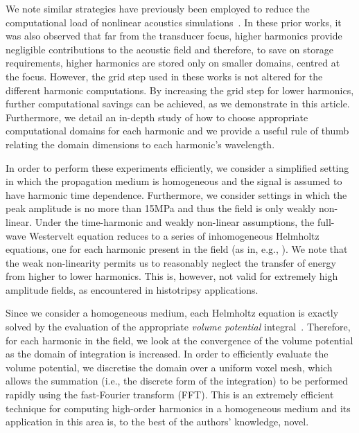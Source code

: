 \documentclass[11pt]{article}
\numberwithin{equation}{section}
\newcommand{\red}[1]{{\color{black} #1}}
\begin{document}
\red{We note similar strategies have previously been employed to reduce the 
computational load of nonlinear acoustics simulations~\cite{yuldashev2011simulation,karzova2017shock}.
In these prior works, it was also observed that far from the transducer focus, higher harmonics provide 
negligible contributions to the acoustic field and therefore, to save on storage requirements, 
higher harmonics are stored only on smaller domains, centred at the focus. However, the grid
step used in these works is not altered for the different harmonic computations. 
By increasing the grid step for lower harmonics, further computational savings can be 
achieved, as we demonstrate in this article. Furthermore, we detail an in-depth 
study of how to choose appropriate computational domains for each harmonic and 
 we provide a useful rule of thumb relating the domain dimensions to each harmonic's wavelength.}


In order to perform these experiments efficiently, we consider a simplified setting 
in which the propagation medium is homogeneous and the signal is assumed to have 
harmonic time dependence. \red{Furthermore, we consider settings in which the peak amplitude 
is no more than 15MPa and thus the field is only weakly non-linear}. Under the time-harmonic 
\red{and weakly non-linear assumptions}, the full-wave Westervelt 
equation reduces to a series of inhomogeneous 
Helmholtz equations, one for each harmonic present in the field (as in, e.g., 
\cite{du2013fast}). %
\red{We note that the weak non-linearity permits us to reasonably neglect the 
transfer of energy from higher to lower harmonics. This is, however, not valid for 
extremely high amplitude fields, as encountered in histotripsy applications.}

Since we consider a homogeneous medium, each Helmholtz equation is exactly solved 
by the evaluation of the appropriate \textit{volume potential} integral~\cite{costabel2015spectrum}. 
Therefore, 
for each harmonic in the field, we look at the convergence of the volume potential 
as the domain of integration is increased. In order to efficiently evaluate the 
volume potential, we discretise the domain over a uniform voxel mesh, which allows the 
summation (i.e., the discrete form of the integration) to be performed rapidly 
using the fast-Fourier transform (FFT). This is an extremely efficient technique 
for computing high-order harmonics in a homogeneous medium and its application in 
this area is, to the best of the authors' knowledge, novel.
\end{document}
